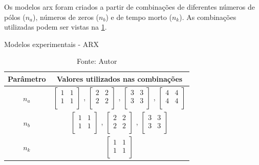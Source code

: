 Os modelos \acrshort{arx} foram criados a partir de combinações de diferentes números de pólos ($n_a$),
números de zeros ($n_b$) e de tempo morto ($n_k$). As combinações utilizadas podem ser vistas na
\cref{tab:tclabsp-models-arx}.

\begin{table}[h]
	\centering
	\caption{Modelos experimentais - ARX}
	\label{tab:tclabsp-models-arx}
	\begin{tabular}{c|c} \toprule
		{Parâmetro}		&	{Valores utilizados nas combinações}									\\ \midrule
		$n_a$			&
							$ \begin{bmatrix}	1	&	1	\\	1	&	1	\\	\end{bmatrix} $	,		
							$ \begin{bmatrix}	2	&	2	\\	2	&	2	\\	\end{bmatrix} $	,		
							$ \begin{bmatrix}	3	&	3	\\	3	&	3	\\	\end{bmatrix} $	,		
							$ \begin{bmatrix}	4	&	4	\\	4	&	4	\\	\end{bmatrix} $		\\ \midrule
		$n_b$			&
							$ \begin{bmatrix}	1	&	1	\\	1	&	1	\\	\end{bmatrix} $	,		
							$ \begin{bmatrix}	2	&	2	\\	2	&	2	\\	\end{bmatrix} $	,		
							$ \begin{bmatrix}	3	&	3	\\	3	&	3	\\	\end{bmatrix} $	 	\\ \midrule
		$n_k$			&
							$ \begin{bmatrix}	1	&	1	\\	1	&	1	\\	\end{bmatrix} $		\\ \bottomrule
	\end{tabular}
	\caption*{Fonte: Autor}
\end{table}

